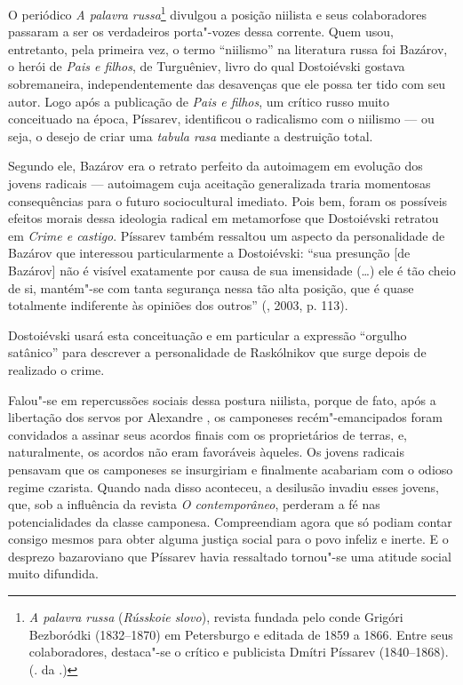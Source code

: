 O periódico \emph{A palavra russa}\footnote{\emph{A palavra russa}
  (\emph{Rússkoie slovo}), revista fundada pelo conde Grigóri Bezboródki
  (1832--1870) em Petersburgo e editada de 1859 a 1866. Entre seus
  colaboradores, destaca"-se o crítico e publicista Dmítri Píssarev
  (1840--1868). (. da .)} divulgou a posição niilista e seus
colaboradores passaram a ser os verdadeiros porta"-vozes dessa corrente.
Quem usou, entretanto, pela primeira vez, o termo ``niilismo'' na
literatura russa foi Bazárov, o herói de \emph{Pais e filhos}, de
Turguêniev, livro do qual Dostoiévski gostava sobremaneira,
independentemente das desavenças que ele possa ter tido com seu autor.
Logo após a publicação de \emph{Pais e filhos}, um crítico russo muito
conceituado na época, Píssarev, identificou o radicalismo com o niilismo
--- ou seja, o desejo de criar uma \emph{tabula rasa} mediante a
destruição total.

Segundo ele, Bazárov era o retrato perfeito da autoimagem em evolução
dos jovens radicais --- autoimagem cuja aceitação generalizada traria
momentosas consequências para o futuro sociocultural imediato. Pois bem,
foram os possíveis efeitos morais dessa ideologia radical em metamorfose
que Dostoiévski retratou em \emph{Crime e castigo}. Píssarev também
ressaltou um aspecto da personalidade de Bazárov que interessou
particularmente a Dostoiévski: ``sua presunção [de Bazárov] não é
visível exatamente por causa de sua imensidade (\ldots{}) ele é tão cheio de
si, mantém"-se com tanta segurança nessa tão alta posição, que é quase
totalmente indiferente às opiniões dos outros'' (, 2003, p. 113).

Dostoiévski usará esta conceituação e em particular a expressão
``orgulho satânico'' para descrever a personalidade de Raskólnikov que
surge depois de realizado o crime.

Falou"-se em repercussões sociais dessa postura niilista, porque de fato,
após a libertação dos servos por Alexandre , os camponeses
recém"-emancipados foram convidados a assinar seus acordos finais com os
proprietários de terras, e, naturalmente, os acordos não eram favoráveis
àqueles. Os jovens radicais pensavam que os camponeses se insurgiriam e
finalmente acabariam com o odioso regime czarista. Quando nada disso
aconteceu, a desilusão invadiu esses jovens, que, sob a influência da
revista \emph{O contemporâneo}, perderam a fé nas potencialidades da
classe camponesa. Compreendiam agora que só podiam contar consigo mesmos
para obter alguma justiça social para o povo infeliz e inerte. E o
desprezo bazaroviano que Píssarev havia ressaltado tornou"-se uma atitude
social muito difundida.

